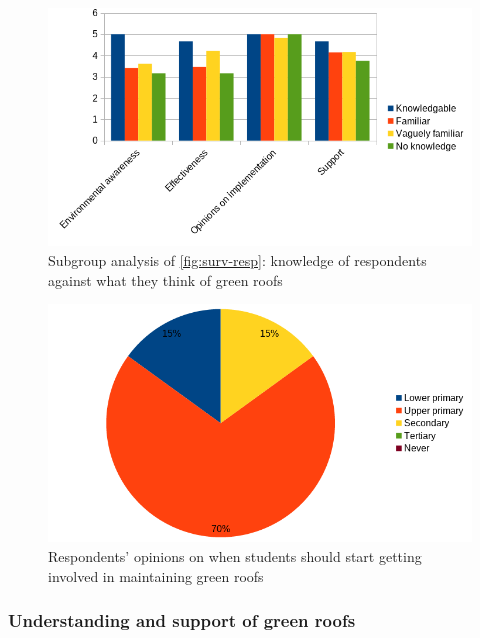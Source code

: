 \documentclass[a4paper]{article}
\begin{document}
\begin{multicols}{2}
  \begin{figure}[H]
    \centering
    \includegraphics[width=\linewidth]{knowledge-opinions.png}
    \caption{
      Subgroup analysis of \cref{fig:surv-resp}: knowledge of respondents
      against what they think of green roofs
    }
    \label{fig:know-opn}
  \end{figure}

  \begin{figure}[H]
    \centering
    \includegraphics[width=\linewidth]{level.png}
    \caption{
      Respondents' opinions on when students should start getting involved
      in maintaining green roofs
    }
    \label{fig:levels}
  \end{figure}

  \subsubsection{Understanding and support of green roofs}

\end{multicols}
\end{document}
